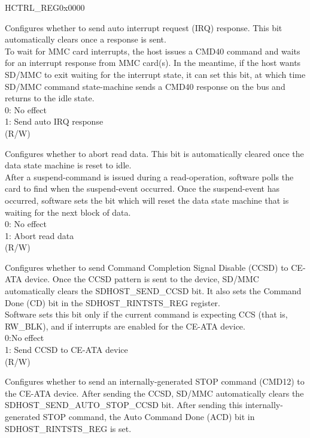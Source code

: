 \addtocounter{Regfloat}{-1}
\begin{register}{H}{CTRL\_REG}{0x0000}
\begin{regdesc}\begin{reglist}
\item [Continued from the previous page...]

\label{fielddesc:SDHOSTSENDIRQRESPONSE}\item [SDHOST\_SEND\_IRQ\_RESPONSE] Configures whether to send auto interrupt request (IRQ) response. This bit automatically clears once a response is sent.\\
To wait for MMC card interrupts, the host issues a CMD40 command and waits for an interrupt response from MMC card(s). In the meantime, if the host wants SD/MMC to exit waiting for the interrupt state, it can set this bit, at which time SD/MMC command state-machine sends a CMD40 response on the bus and returns to the idle state.\\
0: No effect\\1: Send auto IRQ response\\(R/W)
\label{fielddesc:SDHOSTABORTREADDATA}\item [SDHOST\_ABORT\_READ\_DATA] Configures whether to abort read data. This bit is automatically cleared once the data state machine is reset to idle.\\
After a suspend-command is issued during a read-operation, software polls the card to find when the suspend-event occurred. Once the suspend-event has occurred, software sets the bit which will reset the data state machine that is waiting for the next block of data.\\
0: No effect\\1: Abort read data\\(R/W)
\label{fielddesc:SDHOSTSENDCCSD}\item [SDHOST\_SEND\_CCSD] Configures whether to send Command Completion Signal Disable (CCSD) to CE-ATA device. Once the CCSD pattern is sent to the device, SD/MMC automatically clears the SDHOST\_SEND\_CCSD bit. It also sets the Command Done (CD) bit  in the SDHOST\_RINTSTS\_REG register.\\
Software sets this bit only if the current command is expecting CCS (that is, RW\_BLK), and if interrupts are enabled for the CE-ATA device.\\
0:No effect\\1: Send CCSD to CE-ATA device\\(R/W)
\label{fielddesc:SDHOSTSENDAUTOSTOPCCSD}\item [SDHOST\_SEND\_AUTO\_STOP\_CCSD] Configures whether to send an internally-generated STOP command (CMD12) to the CE-ATA device. After sending the CCSD, SD/MMC automatically clears the SDHOST\_SEND\_AUTO\_STOP\_CCSD bit. After sending this internally-generated STOP command, the Auto Command Done (ACD) bit in SDHOST\_RINTSTS\_REG is set.\\

\end{reglist}
\end{regdesc}
\end{register}
